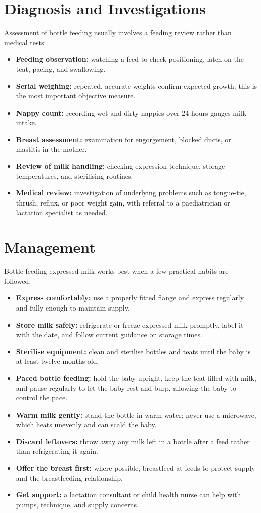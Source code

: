 \section*{Diagnosis and Investigations}
Assessment of bottle feeding usually involves a feeding review rather than medical tests:
\begin{itemize}
    \item \textbf{Feeding observation:} watching a feed to check positioning, latch on the teat, pacing, and swallowing.
    \item \textbf{Serial weighing:} repeated, accurate weights confirm expected growth; this is the most important objective measure.
    \item \textbf{Nappy count:} recording wet and dirty nappies over 24 hours gauges milk intake.
    \item \textbf{Breast assessment:} examination for engorgement, blocked ducts, or mastitis in the mother.
    \item \textbf{Review of milk handling:} checking expression technique, storage temperatures, and sterilising routines.
    \item \textbf{Medical review:} investigation of underlying problems such as tongue-tie, thrush, reflux, or poor weight gain, with referral to a paediatrician or lactation specialist as needed.
\end{itemize}

\section*{Management}
Bottle feeding expressed milk works best when a few practical habits are followed:
\begin{itemize}
    \item \textbf{Express comfortably:} use a properly fitted flange and express regularly and fully enough to maintain supply.
    \item \textbf{Store milk safely:} refrigerate or freeze expressed milk promptly, label it with the date, and follow current guidance on storage times.
    \item \textbf{Sterilise equipment:} clean and sterilise bottles and teats until the baby is at least twelve months old.
    \item \textbf{Paced bottle feeding:} hold the baby upright, keep the teat filled with milk, and pause regularly to let the baby rest and burp, allowing the baby to control the pace.
    \item \textbf{Warm milk gently:} stand the bottle in warm water; never use a microwave, which heats unevenly and can scald the baby.
    \item \textbf{Discard leftovers:} throw away any milk left in a bottle after a feed rather than refrigerating it again.
    \item \textbf{Offer the breast first:} where possible, breastfeed at feeds to protect supply and the breastfeeding relationship.
    \item \textbf{Get support:} a lactation consultant or child health nurse can help with pumps, technique, and supply concerns.
\end{itemize}

